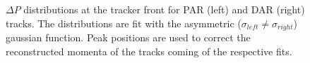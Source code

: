 \begin{figure}
\hspace{-1.4in}

\caption{
  \label{fig:sindrum_ii_fig_08_fit} 
  $\Delta P$ distributions at the tracker front for PAR (left) and DAR (right) tracks. The distributions  
  are fit with the asymmetric ($\sigma_{left} \ne \sigma_{right}$) gaussian function. Peak positions are used
  to correct the reconstructed  momenta of the tracks coming of the respective fits.
}
\end{figure}

